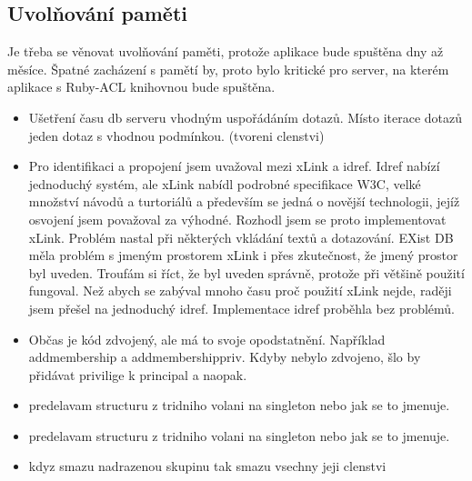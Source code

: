 \documentclass[11pt,twoside,a4paper]{book}
\begin{document}
\subsection{Uvolňování paměti}
Je třeba se věnovat uvolňování paměti, protože aplikace bude spuštěna dny až měsíce. Špatné zacházení s pamětí by, proto bylo kritické pro server, na kterém aplikace s Ruby-ACL knihovnou bude spuštěna.
\begin{itemize}
\item Ušetření času db serveru vhodným uspořádáním dotazů. Místo iterace dotazů jeden dotaz s vhodnou podmínkou. (tvoreni clenstvi) 
\item Pro identifikaci a propojení jsem uvažoval mezi xLink a idref. Idref nabízí jednoduchý systém, ale xLink nabídl podrobné specifikace W3C, velké množství návodů a turtoriálů a především se jedná o novější technologii, jejíž osvojení jsem považoval za výhodné. Rozhodl jsem se proto implementovat xLink. Problém nastal při některých vkládání textů a dotazování. EXist DB měla problém s jmeným prostorem xLink i přes zkutečnost, že jmený prostor byl uveden. Troufám si říct, že byl uveden správně, protože při většině použití fungoval. Než abych se zabýval mnoho času proč použití xLink nejde, raději jsem přešel na jednoduchý idref. Implementace idref proběhla bez problémů.
\item Občas je kód zdvojený, ale má to svoje opodstatnění. Například addmembership a addmembershippriv. Kdyby nebylo zdvojeno, šlo by přidávat privilige k principal a naopak.
\item predelavam structuru z tridniho volani na singleton nebo jak se to jmenuje.\item predelavam structuru z tridniho volani na singleton nebo jak se to jmenuje.
\item kdyz smazu nadrazenou skupinu tak smazu vsechny jeji clenstvi
\end{itemize}

\end{document}
